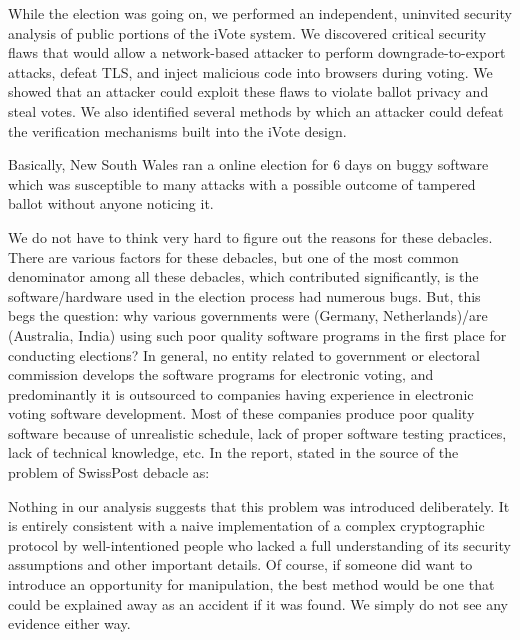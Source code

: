   \begin{displayquote}
  
  
   While the election was going on, we performed an independent,
   uninvited security analysis of public portions of the iVote 
   system. We discovered critical security flaws that would allow
   a network-based attacker to perform downgrade-to-export 
   attacks, defeat TLS, and inject malicious code 
   into browsers during voting. We showed that an attacker could
   exploit these flaws to violate ballot privacy and steal votes. 
   We also identified several methods by which an attacker could
   defeat the verification mechanisms built into the iVote design.
   
   \end{displayquote}
  
  \noindent
  Basically, New South Wales ran a online election for 6 days on 
  buggy software which was susceptible to many attacks with a possible 
  outcome of tampered ballot without anyone noticing it. 

   We do not have to think very hard to figure out the reasons for 
   these debacles. 
   There are various factors for these debacles, but one of the most 
   common denominator among all these debacles,
   which contributed significantly,  is the software/hardware used in the election process 
   had numerous  bugs. 
   But, this begs the question: why various governments 
   were (Germany, Netherlands)/are (Australia, India) using such poor quality software programs
   in the first place for conducting elections? 
   In general, no entity related to government or electoral commission develops the software programs 
   for electronic voting, and predominantly it is outsourced 
   to companies having experience in electronic voting software development.   
   Most of these companies produce poor quality software because 
   of unrealistic schedule, lack of proper software testing practices, 
   lack of technical knowledge, etc. In the report, \citep{TSwiss} stated 
   in the source of the problem of SwissPost debacle as:
   
   \begin{displayquote}
    Nothing in our analysis suggests that this problem was introduced deliberately.  
    It is entirely consistent with a naive implementation of a complex cryptographic
    protocol by well-intentioned people who lacked a full understanding of its security
    assumptions and other important details.  Of course,  if someone did want to 
    introduce an opportunity for manipulation, the best method would be one that 
    could be explained away as an accident if it was found.  
    We simply do not see any evidence either way.
    \end{displayquote}
   
